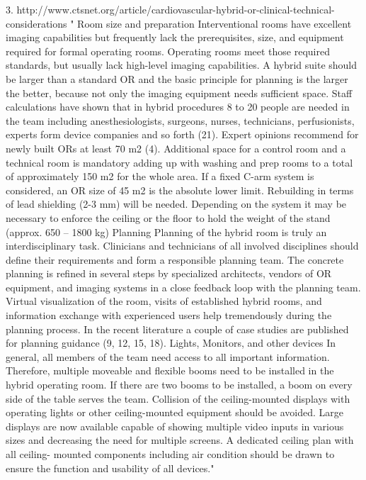 3. http://www.ctsnet.org/article/cardiovascular-hybrid-or-clinical-technical-considerations	
	"	Room size and preparation
	Interventional rooms have excellent imaging capabilities but frequently lack the prerequisites, size, and equipment required for formal operating rooms. Operating rooms meet those required standards, but usually lack high-level imaging capabilities. A hybrid suite should be larger than a standard OR and the basic principle for planning is the larger the better, because not only the imaging equipment needs sufficient space. Staff calculations have shown that in hybrid procedures 8 to 20 people are needed in the team including anesthesiologists, surgeons, nurses, technicians, perfusionists, experts form device companies and so forth (21). Expert opinions recommend for newly built ORs at least 70 m2 (4). Additional space for a control room and a technical room is mandatory adding up with washing and prep rooms to a total of approximately 150 m2 for the whole area. If a fixed C-arm system is considered, an OR size of 45 m2 is the absolute lower limit. Rebuilding in terms of lead shielding (2-3 mm) will be needed. Depending on the system it may be necessary to enforce the ceiling or the floor to hold the weight of the stand (approx. 650 – 1800 kg)
		Planning
	Planning of the hybrid room is truly an interdisciplinary task. Clinicians and technicians of all involved disciplines should define their requirements and form a responsible planning team. The concrete planning is refined in several steps by specialized architects, vendors of OR equipment, and imaging systems in a close feedback loop with the planning team. Virtual visualization of the room, visits of established hybrid rooms, and information exchange with experienced users help tremendously during the planning process. In the recent literature a couple of case studies are published for planning guidance (9, 12, 15, 18).
		Lights, Monitors, and other devices
	In general, all members of the team need access to all important information. Therefore, multiple moveable and flexible booms need to be installed in the hybrid operating room. If there are two booms to be installed, a boom on every side of the table serves the team. Collision of the ceiling-mounted displays with operating lights or other ceiling-mounted equipment should be avoided. Large displays are now available capable of showing multiple video inputs in various sizes and decreasing the need for multiple screens. A dedicated ceiling plan with all ceiling- mounted components including air condition should be drawn to ensure the function and usability of all devices."
	
